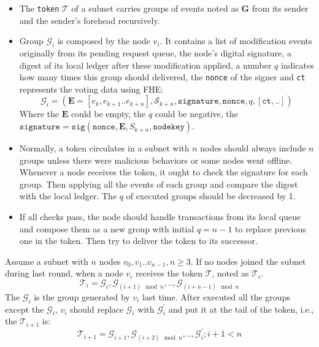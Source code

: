 \documentclass[11pt]{article}
\begin{document}
\begin{itemize}
\item The \texttt{token} $\mathcal{T}$ of a subnet carries groups of events noted as $\mathbf{G}$ from its sender and the sender{'}s forehead recursively.
\item Group $\mathcal{G}_{i}$ is composed by the node $v_{i}$. It contains a list of modification events originally from its pending request queue, the node{'}s digital signature, a digest of its local ledger after these modification applied, a number $q$ indicates how many times this group should delivered, the \texttt{nonce} of the signer and \texttt{ct} represents the voting data using FHE:
\begin{equation}
\mathcal{G}_{i} = (\mathbf{E} = [e_{k}, e_{k+1}..e_{k+n}], \mathcal{S}_{k+n}, \texttt{signature}, \texttt{nonce}, q, [\texttt{ct},..])
\end{equation}
Where the $\mathbf{E}$ could be empty, the $q$ could be negative, the \(\texttt{signature} = \texttt{sig}(\texttt{nonce}, \mathbf{E}, S_{k+n}, \texttt{nodekey})\).

\item Normally, a token circulates in a subnet with $n$ nodes should always include $n$ groups unless there were malicious behaviors or some nodes went offline.
Whenever a node receives the token, it ought to check the signature for each group.
Then applying all the events of each group and compare the digest with the local ledger.
The $q$ of executed groups should be decreased by 1.

\item If all checks pass, the node should handle transactions from its local queue and compose them as a new group with initial $q=n-1$ to replace previous one in the token.
Then try to deliver the token to its successor.
\end{itemize}

Assume a subnet with $n$ nodes \( v_{0}, v_{1} .. v_{n-1}, n\geq 3\). If no nodes joined the subnet during last round, when a node $v_{i}$ receives the token $\mathcal{T}$, noted as $\mathcal{T}_{i}$.
\begin{equation}
\mathcal{T}_{i} = \mathcal{G}_{i}, \mathcal{G}_{(i + 1)\mod n},.., \mathcal{G}_{(i + n - 1)\mod n}
\end{equation}
The $\mathcal{G}_{i}$ is the group generated by $v_{i}$ last time. After executed all the groups except the $\mathcal{G}_{i}$, $v_{i}$ should replace $\mathcal{G}_{i}$ with $\mathcal{G}_{i}^{\prime}$ and put it at the tail of the token, i.e., the $\mathcal{T}_{i+1}$ is:
\begin{equation}
\mathcal{T}_{i+1} = \mathcal{G}_{i+1}, \mathcal{G}_{(i+2)\mod n},.., \mathcal{G}_{i}^{\prime}; i+1<n
\end{equation}
\end{document}
